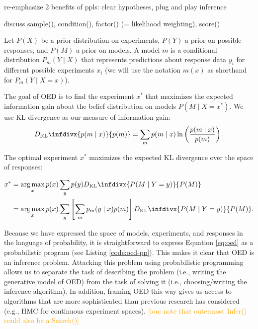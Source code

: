 \documentclass{article}
\newcommand{\dkl}{D_\mathrm{KL}\infdivx}
\newcommand{\lou}[1]{\textcolor{orange}{[lou: #1]}}
\newcommand{\cas}[1]{ \textsf{\color{darkgray} \scriptsize #1} }
\DeclareMathOperator*{\argmax}{arg\,max}
\begin{document}
\cas{re-emphasize 2 benefits of ppls: clear hypotheses, plug and play inference}

\cas{discuss sample(), condition(), factor() (= likelihood weighting), score()}

Let $P(X)$ be a prior distribution on experiments, $P(Y)$ a prior on possible responses, and $P(M)$ a prior on models.
A model $m$ is a conditional distribution $P_m(Y \mid X)$ that represents predictions about response data $y_i$ for different possible experiments $x_i$ (we will use the notation $m(x)$ as shorthand for $P_m(Y \mid X = x)$).

The goal of OED is to find the experiment $x^{*}$ that maximizes the expected information gain about the belief distribution on models $P(M \mid X = x^{*})$.
We use KL divergence as our measure of information gain:
\begin{align}
  \dkl{ p(m \mid x) }{ p(m) }  = \sum\limits_m p(m \mid x) \ln \left( \frac{p(m \mid x)}{p(m)}\right). \label{eq:kl}
\end{align}

The optimal experiment $x^*$ maximizes the expected KL divergence over the space of responses:

\begin{align}
x^{*} &= \argmax_{x} p(x) \sum\limits_{y} p(y) \dkl{ P(M \mid Y = y) }{ P(M) } \notag \\
    &= \argmax_{x} p(x) \sum\limits_{y} \left[\sum\limits_{m} p_m(y \mid x)p(m)\right] \dkl{P(M \mid Y = y)}{P(M)}. \label{eq:oed}
\end{align}

Because we have expressed the space of models, experiments, and responses in the language of probability, it is straightforward to express Equation \ref{eq:oed} as a probabilistic program (see Listing \ref{code:oed-pp}).
This makes it clear that OED is an inference problem.
Attacking this problem using probabilistic programming allows us to separate the task of describing the problem (i.e., writing the generative model of OED) from the task of solving it (i.e., choosing/writing the inference algorithm).
In addition, framing OED this way gives us access to algorithms that are more sophisticated than previous research has considered  (e.g., HMC for continuous experiment spaces).
\lou{note that outermost Infer() could also be a Search()}
\end{document}
